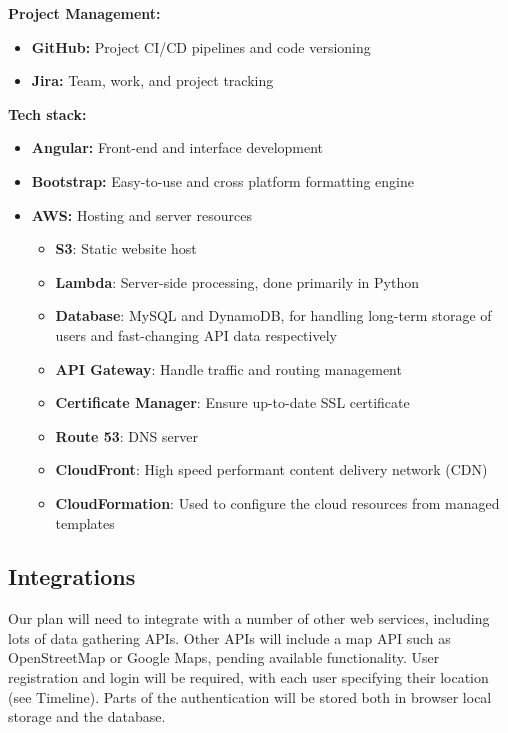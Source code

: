 \documentclass[12pt]{article}
\begin{document}
\textbf{Project Management:}

\begin{itemize}
    \item \textbf{GitHub:} Project CI/CD pipelines and code versioning
    \item \textbf{Jira:} Team, work, and project tracking
\end{itemize}


\textbf{Tech stack:}
\begin{itemize}
    \item \textbf{Angular:}  Front-end and interface development
    \item \textbf{Bootstrap:} Easy-to-use and cross platform formatting engine
    \item \textbf{AWS:} Hosting and server resources
          \begin{itemize}
              \item{\bf S3}: Static website host
              \item{\bf Lambda}: Server-side processing, done primarily in Python
              \item{\bf Database}: MySQL and DynamoDB, for handling long-term storage of users and fast-changing API data respectively
              \item{\bf API Gateway}: Handle traffic and routing management
              \item{\bf Certificate Manager}: Ensure up-to-date SSL certificate
              \item{\bf Route 53}: DNS server
              \item{\bf CloudFront}: High speed performant content delivery network (CDN)
              \item{\bf CloudFormation}: Used to configure the cloud resources from managed templates
          \end{itemize}
\end{itemize}

\subsection{Integrations}

Our plan will need to integrate with a number of other web services, including lots of data gathering APIs. Other APIs will include a map API such as OpenStreetMap or Google Maps, pending available functionality.
User registration and login will be required, with each user specifying their location (see Timeline). Parts of the authentication will be stored both in browser local storage and the database.
\end{document}
